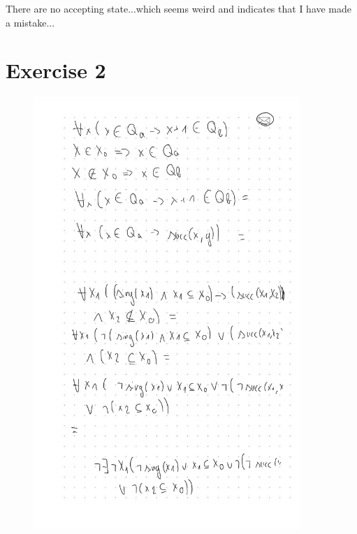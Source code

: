 \documentclass[a4paper,11pt]{report}
\begin{document}
There are no accepting state...which seems weird and indicates that I have made
a mistake...

\section*{Exercise 2}

\begin{figure}[ht]
  \centering
  \includegraphics[width=0.9\textwidth]{ex2}
\end{figure}
\end{document}
